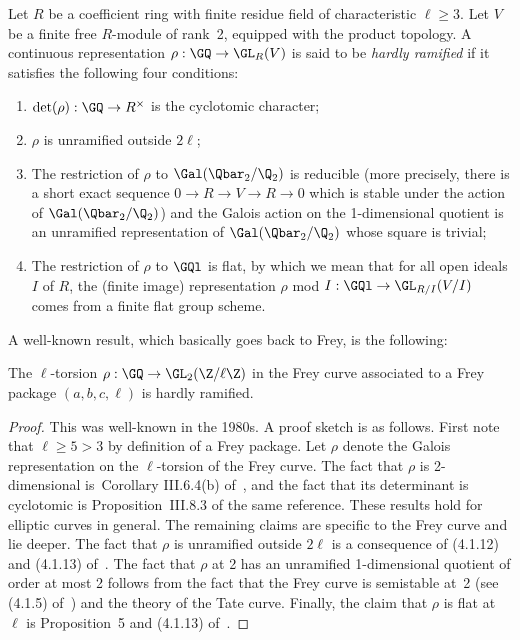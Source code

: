 \begin{definition}
  \label{hardly_ramified}
  Let $R$ be a coefficient ring with finite residue field of characteristic $\ell\geq3$.
  Let $V$ be a finite free $R$-module of rank~2, equipped with the product topology. A
  continuous representation $\rho: \GQ\to \GL_R(V)$ is said to be \emph{hardly ramified} if it
  satisfies the following four conditions:
  \begin{enumerate}
  \item $\det(\rho):\GQ\to R^\times$ is the cyclotomic character;
  \item $\rho$ is unramified outside $2\ell$;
  \item The restriction of $\rho$ to $\Gal(\Qbar_2/\Q_2)$ is reducible (more precisely,
  there is a short exact sequence $0\to R\to V\to R\to 0$ which is stable
  under the action of $\Gal(\Qbar_2/\Q_2)$) and the Galois action on the 1-dimensional
  quotient is an unramified representation of $\Gal(\Qbar_2/\Q_2)$ whose square is trivial;
  \item The restriction of $\rho$ to $\GQl$ is flat, by which we mean that for all open
  ideals $I$ of $R$, the (finite image) representation $\rho$ mod $I:\GQl\to \GL_{R/I}(V/I)$
  comes from a finite flat group scheme.
  \end{enumerate}
\end{definition}

A well-known result, which basically goes back to Frey, is the following:

\begin{theorem}
  \label{Frey_curve_hardly_ramified}
  The $\ell$-torsion $\rho:\GQ\to\GL_2(\Z/\ell\Z)$ in the Frey curve associated to a Frey
  package $(a,b,c,\ell)$ is hardly ramified.
\end{theorem}
\begin{proof}
  This was well-known in the 1980s. A proof sketch is as follows.
  First note that $\ell\geq5>3$ by definition of a Frey package. Let $\rho$
  denote the Galois representation on the $\ell$-torsion of the Frey curve.
  The fact that $\rho$ is 2-dimensional is~Corollary
  III.6.4(b) of~\cite{silverman1}, and the fact that its determinant is
  cyclotomic is Proposition~III.8.3 of the same reference. These results hold for elliptic curves
  in general. The remaining claims are specific to the Frey curve and lie
  deeper. The fact that $\rho$ is unramified outside $2\ell$ is a consequence
  of (4.1.12) and (4.1.13) of~\cite{serreconj}. The fact that $\rho$ at 2
  has an unramified 1-dimensional quotient of order at most 2 follows from
  the fact that the Frey curve is semistable at~2 (see (4.1.5) of~\cite{serreconj})
  and the theory of the Tate curve. Finally, the claim that $\rho$ is flat at $\ell$
  is Proposition~5 and (4.1.13) of~\cite{serreconj}.
\end{proof}

